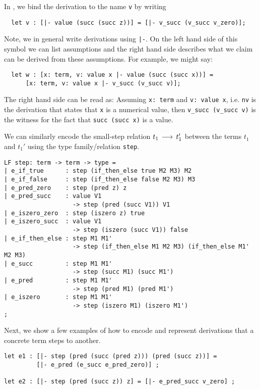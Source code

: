 In \beluga, we bind the derivation to the name \lstinline!v! by writing 
\begin{lstlisting}
  let v : [|- value (succ (succ z))] = [|- v_succ (v_succ v_zero)];
\end{lstlisting}  
Note,  we in general write
derivations using \lstinline!|-!.  On the left hand side  of this symbol  we can
list assumptions and the right hand side describes  what we claim can be derived
from these assumptions.  For example, we might say:

\begin{lstlisting}
  let w : [x: term, v: value x |- value (succ (succ x))] =
      [x: term, v: value x |- v_succ (v_succ v)];
\end{lstlisting}

The  right  hand  side   can  be  read  as:   Assuming  \lstinline!x: term!  and
\lstinline!v: value x!,  i.e. \lstinline!nv!  is the derivation that states
that \lstinline!x! is  a numerical value,  then \lstinline!v_succ (v_succ v)!
is the witness for the fact that \lstinline!succ (succ x)! is a value.

We can similarly  encode the small-step relation  $t_1 \mathrel{\,\longrightarrow\,} t_1'$  between the
terms $t_1$ and $t_1'$ using the type family/relation \lstinline!step!.

\begin{lstlisting}
LF step: term -> term -> type =
| e_if_true      : step (if_then_else true M2 M3) M2
| e_if_false     : step (if_then_else false M2 M3) M3
| e_pred_zero    : step (pred z) z
| e_pred_succ    : value V1
                   -> step (pred (succ V1)) V1
| e_iszero_zero  : step (iszero z) true
| e_iszero_succ  : value V1
                   -> step (iszero (succ V1)) false
| e_if_then_else : step M1 M1'
                   -> step (if_then_else M1 M2 M3) (if_then_else M1' M2 M3)
| e_succ         : step M1 M1'
                   -> step (succ M1) (succ M1')
| e_pred         : step M1 M1'
                   -> step (pred M1) (pred M1')
| e_iszero       : step M1 M1'
                   -> step (iszero M1) (iszero M1')
;
\end{lstlisting}

Next,  we show a few examples of  how to encode and represent derivations that a
concrete term steps to another.

\begin{lstlisting}
let e1 : [|- step (pred (succ (pred z))) (pred (succ z))] =
         [|- e_pred (e_succ e_pred_zero)] ;

let e2 : [|- step (pred (succ z)) z] = [|- e_pred_succ v_zero] ;
\end{lstlisting}

